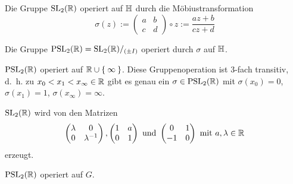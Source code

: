\begin{proposition}%
    \begin{propenum}
        \item Die Gruppe $\mathrm{SL}_2(\mathbb{R})$ operiert auf $\mathbb{H}$ durch die Möbiustransformation
              \[\sigma(z):= \begin{pmatrix}a & b\\c & d\end{pmatrix} \circ z := \frac{az + b}{cz + d}\]
        \item Die Gruppe $\mathrm{PSL}_2(\mathbb{R}) = \mathrm{SL}_2(\mathbb{R}) /_{(\pm I)}$ operiert durch $\sigma$ auf $\mathbb{H}$.
        \item \label{prop:15.2c} $\mathrm{PSL}_2(\mathbb{R})$ operiert auf $\mathbb{R} \cup \Set{\infty}$.
              Diese Gruppenoperation ist 3-fach transitiv, d.~h. zu
              $x_0 < x_1 < x_\infty \in \mathbb{R}$ gibt es genau ein
              $\sigma \in \mathrm{PSL}_2(\mathbb{R})$ mit $\sigma(x_0) = 0$,
              $\sigma(x_1) = 1$, $\sigma(x_\infty) = \infty$.
        \item \label{prop:15.2d} $\mathrm{SL}_2(\mathbb{R})$ wird von den Matrizen
              \[\begin{pmatrix}\lambda & 0\\ 0 & \lambda^{-1}\end{pmatrix},
                \begin{pmatrix}1 & a\\ 0 & 1\end{pmatrix} \text{ und }
                \begin{pmatrix}0 & 1\\-1 & 0\end{pmatrix} \text{ mit } a, \lambda \in \mathbb{R}\]
              erzeugt.
        \item \label{prop:15.2e} $\mathrm{PSL}_2(\mathbb{R})$ operiert auf $G$.
    \end{propenum}
\end{proposition}

